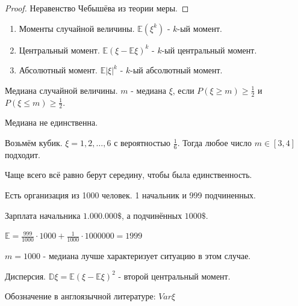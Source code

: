 \begin{proof}
    Неравенство Чебышёва из теории меры.
\end{proof}

\begin{definition}
    \begin{enumerate}
        \item Моменты случайной величины. $\mathbb{E} (\xi^k)$ - $k$-ый момент.
        \item Центральный момент. $\mathbb{E}(\xi - \mathbb{E}\xi)^k$ - $k$-ый центральный момент.
        \item Абсолютный момент. $\mathbb{E}|\xi|^k$ - $k$-ый абсолютный момент.
    \end{enumerate}
\end{definition}

\begin{definition}
    Медиана случайной величины. $m$ - медиана $\xi$, если $P(\xi \geqslant m) \geqslant \frac{1}{2}$ и 
    $P(\xi \leqslant m) \geqslant \frac{1}{2}$.

    \begin{remark}
        Медиана не единственна.

        Возьмём кубик. $\xi = 1, 2, \ldots, 6$ с вероятностью $\frac{1}{6}$. 
        Тогда любое число $m \in [3, 4]$ подходит.

        Чаще всего всё равно берут середину, чтобы была единственность.
    \end{remark}
\end{definition}

\begin{example}
    Есть организация из 1000 человек. 1 начальник и 999 подчиненных.

    Зарплата начальника $1.000.000 \$ $, а подчинённых $1000 \$ $.

    $\mathbb{E} = \frac{999}{1000} \cdot 1000 + \frac{1}{1000} \cdot 1000000 = 1999$

    $m = 1000$ - медиана лучше характеризует ситуацию в этом случае.
\end{example}

\begin{definition}
    Дисперсия. $\mathbb{D} \xi = \mathbb{E}(\xi - \mathbb{E} \xi)^2$ - второй центральный момент.

    Обозначение в англоязычной литературе: $Var \xi$
\end{definition}

